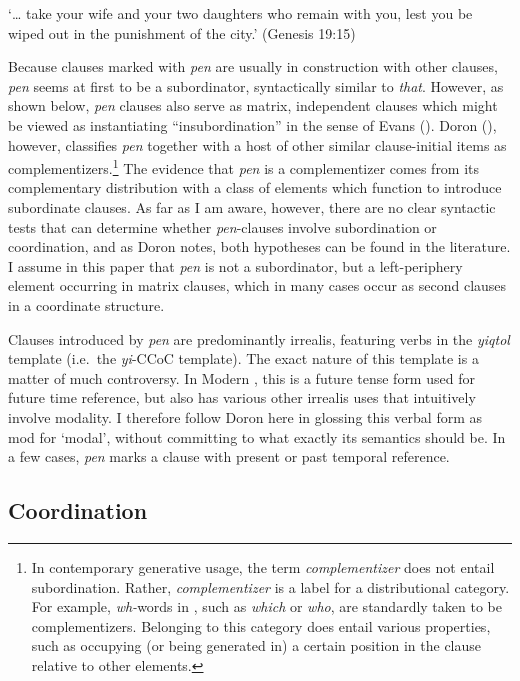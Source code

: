 \documentclass[output=paper,colorlinks,citecolor=brown]{langscibook}
\begin{document}
\glt  `{\ldots} take your wife and your two daughters who remain with you, lest you be wiped out in the punishment of the city.' (Genesis 19:15)
\z

 Because clauses marked with \textit{pen} are usually in construction with other clauses, \textit{pen} seems at first to be a subordinator, syntactically similar to  \textit{that}. However, as shown below, \textit{pen} clauses also serve as matrix, independent clauses which might be viewed as instantiating ``insubordination'' in the sense of Evans (\citeyear{evans2007}). Doron (\citeyear{doron19}), however, classifies \textit{pen} together with a host of other similar clause-initial items as complementizers.\footnote{In contemporary generative usage, the term \textit{complementizer} does not entail subordination. Rather, \textit{complementizer} is a label for a distributional category. For example, \textit{wh-}words in , such as \textit{which} or \textit{who}, are standardly taken to be complementizers. Belonging to this category does entail various properties, such as occupying (or being generated in) a certain position in the clause relative to other elements.} The evidence that \textit{pen} is a complementizer comes from its complementary distribution with a  class of elements which function to introduce subordinate clauses. As far as I am aware, however, there are no clear syntactic tests that can determine whether \textit{pen}-clauses involve subordination or coordination, and as Doron notes, both hypotheses can be found in the literature. I assume in this paper that \textit{pen} is not a subordinator, but a left-periphery element occurring in  matrix clauses, which in many cases occur as second clauses in a coordinate structure.  

Clauses introduced by \textit{pen} are predominantly irrealis, featuring verbs in the \textit{yiqtol} template (i.e.\ the \textit{yi}-CCoC template). The exact nature of this template is a matter of much controversy. In Modern , this is a future tense form used for future time reference, but also has various other irrealis uses that intuitively involve modality. I therefore follow Doron here in glossing this verbal form as {\sc mod} for `modal', without committing to what exactly its semantics should be. In a few cases, \textit{pen} marks a clause with  present or past temporal reference. 

\subsection{Coordination}
\label{subsec:coordination}
\end{document}
